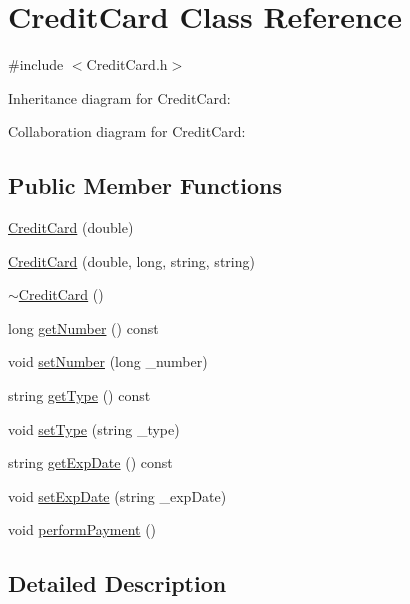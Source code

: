 \hypertarget{classCreditCard}{}\section{Credit\+Card Class Reference}
\label{classCreditCard}


{\ttfamily \#include $<$Credit\+Card.\+h$>$}



Inheritance diagram for Credit\+Card\+:


Collaboration diagram for Credit\+Card\+:
\subsection*{Public Member Functions}
\begin{DoxyCompactItemize}
\item 
\hyperlink{classCreditCard_ac44cde50c1d912b02bf147d22da1b117}{Credit\+Card} (double)
\item 
\hyperlink{classCreditCard_a6d9059ca027aa6ef903158a2efddc35d}{Credit\+Card} (double, long, string, string)
\item 
\hyperlink{classCreditCard_ad52ec9053d232978878bf630e464b67b}{$\sim$\+Credit\+Card} ()
\item 
long \hyperlink{classCreditCard_aa50bbb46d6783a16bf6cd2e840be3d64}{get\+Number} () const 
\item 
void \hyperlink{classCreditCard_aa57cb564e21aef7a8b4f9213f3565992}{set\+Number} (long \+\_\+number)
\item 
string \hyperlink{classCreditCard_a00cf997bfe2dda492ef4562c3b9d0b71}{get\+Type} () const 
\item 
void \hyperlink{classCreditCard_a19cc344b1375f7698267999e424eabb3}{set\+Type} (string \+\_\+type)
\item 
string \hyperlink{classCreditCard_aa2590ced69410bb54b9db593fef414f2}{get\+Exp\+Date} () const 
\item 
void \hyperlink{classCreditCard_a44c7385c4ed7dbb6f19565c01d84cdd4}{set\+Exp\+Date} (string \+\_\+exp\+Date)
\item 
void \hyperlink{classCreditCard_ad41ae39d73adea22555db100311a5101}{perform\+Payment} ()
\end{DoxyCompactItemize}


\subsection{Detailed Description}

